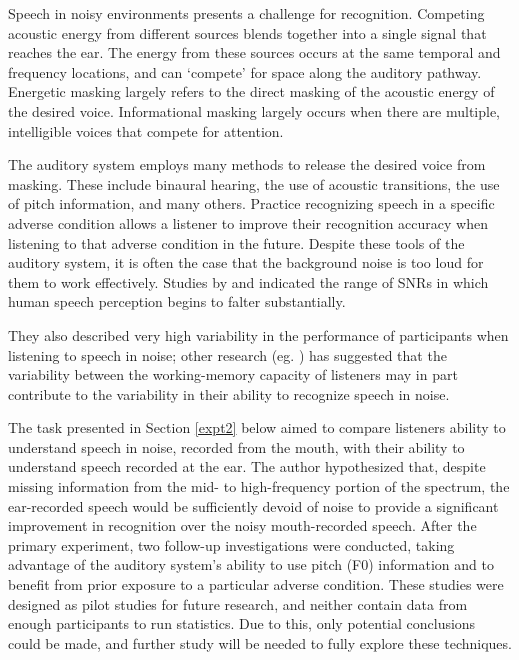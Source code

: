 Speech in noisy environments presents a challenge for recognition.  Competing acoustic energy from different sources blends together into a single signal that reaches the ear.  The energy from these sources occurs at the same temporal and frequency locations, and can `compete' for space along the auditory pathway.  Energetic masking largely refers to the direct masking of the acoustic energy of the desired voice.  Informational masking largely occurs when there are multiple, intelligible voices that compete for attention.

The auditory system employs many methods to release the desired voice from masking.  These include binaural hearing, the use of acoustic transitions, the use of pitch information, and many others.  Practice recognizing speech in a specific adverse condition allows a listener to improve their recognition accuracy when listening to that adverse condition in the future.  Despite these tools of the auditory system, it is often the case that the background noise is too loud for them to work effectively.  Studies by \cite{ding:13} and \cite{gilbert:13} indicated the range of SNRs in which human speech perception begins to falter substantially.

They also described very high variability in the performance of participants when listening to speech in noise; other research (eg. \cite{tamati:13}) has suggested that the variability between the working-memory capacity of listeners may in part contribute to the variability in their ability to recognize speech in noise.

The task presented in Section \ref{expt2} below aimed to compare listeners ability to understand speech in noise, recorded from the mouth, with their ability to understand speech recorded at the ear.  The author hypothesized that, despite missing information from the mid- to high-frequency portion of the spectrum, the ear-recorded speech would be sufficiently devoid of noise to provide a significant improvement in recognition over the noisy mouth-recorded speech.  After the primary experiment, two follow-up investigations were conducted, taking advantage of the auditory system's ability to use pitch (F0) information and to benefit from prior exposure to a particular adverse condition.  These studies were designed as pilot studies for future research, and neither contain data from enough participants to run statistics.  Due to this, only potential conclusions could be made, and further study will be needed to fully explore these techniques. 


